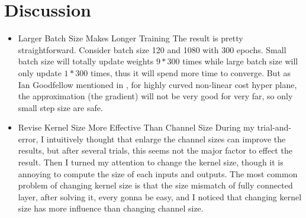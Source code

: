 \documentclass[12pt,a4paper]{article}
\begin{document}
\section{Discussion} \label{sec:dis}
\begin{itemize}
\item{Larger Batch Size Makes Longer Training}
The result is pretty straightforward. Consider batch size 120 and 1080 with 300 epochs. Small batch size will totally update weights $9*300$ times while large batch size will only update $1*300$ times, thus it will spend more time to converge. But as Ian Goodfellow mentioned in \cite{iangoodfellow2016}, for highly curved non-linear cost hyper plane, the approximation (the gradient) will not be very good for very far, so only small step size are safe. 
\item{Revise Kernel Size More Effective Than Channel Size}
During my trial-and-error, I intuitively thought that enlarge the channel sizes can improve the results, but after several trials, this seems not the major factor to effect the result. Then I turned my attention to change the kernel size, though it is annoying to compute the size of each inputs and outputs. The most common problem of changing kernel size is that the size mismatch of fully connected layer, after solving it, every gonna be easy, and I noticed that changing kernel size has more influence than changing channel size. 
\end{itemize}




\end{document}
